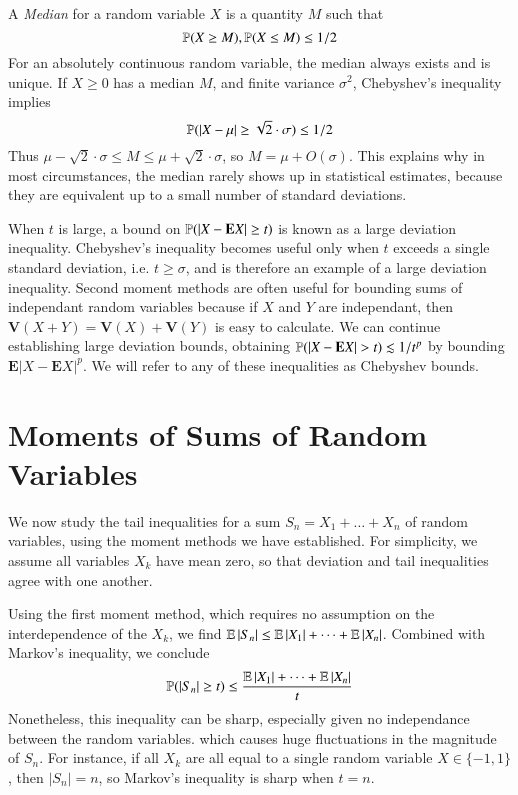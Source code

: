 \begin{example}
    A \emph{Median} for a random variable $X$ is a quantity $M$ such that
    \[ \operatorname{\mathbb{P}}(X \geq M), \operatorname{\mathbb{P}}(X \leq M) \leq 1/2 \]
    For an absolutely continuous random variable, the median always exists and is unique. If $X \geq 0$ has a median $M$, and finite variance $\sigma^2$, Chebyshev's inequality implies
    \[ \operatorname{\mathbb{P}}(|X - \mu| \geq \sqrt{2} \cdot \sigma) \leq 1/2 \]
    Thus $\mu - \sqrt{2} \cdot \sigma \leq M \leq \mu + \sqrt{2} \cdot \sigma$, so $M = \mu + O(\sigma)$. This explains why in most circumstances, the median rarely shows up in statistical estimates, because they are equivalent up to a small number of standard deviations.
\end{example}

When $t$ is large, a bound on $\operatorname{\mathbb{P}}(|X - \mathbf{E}X| \geq t)$ is known as a large deviation inequality. Chebyshev's inequality becomes useful only when $t$ exceeds a single standard deviation, i.e. $t \geq \sigma$, and is therefore an example of a large deviation inequality. Second moment methods are often useful for bounding sums of independant random variables because if $X$ and $Y$ are independant, then $\mathbf{V}(X + Y) = \mathbf{V}(X) + \mathbf{V}(Y)$ is easy to calculate. We can continue establishing large deviation bounds, obtaining $\operatorname{\mathbb{P}}(|X - \mathbf{E} X| > t) \lesssim 1/t^p$ by bounding $\mathbf{E}|X - \mathbf{E}X|^p$. We will refer to any of these inequalities as Chebyshev bounds.

\section{Moments of Sums of Random Variables}

We now study the tail inequalities for a sum $S_n = X_1 + \dots + X_n$ of random variables, using the moment methods we have established. For simplicity, we assume all variables $X_k$ have mean zero, so that deviation and tail inequalities agree with one another.

Using the first moment method, which requires no assumption on the interdependence of the $X_k$, we find $\operatorname{\mathbb{E}} |S_n| \leq \operatorname{\mathbb{E}} |X_1| + \dots + \operatorname{\mathbb{E}} |X_n|$. Combined with Markov's inequality, we conclude
%
\[ \mathbb{P}(|S_n| \geq t) \leq \frac{\operatorname{\mathbb{E}} |X_1| + \dots + \operatorname{\mathbb{E}} |X_n|}{t} \]
%
Nonetheless, this inequality can be sharp, especially given no independance between the random variables. which causes huge fluctuations in the magnitude of $S_n$. For instance, if all $X_k$ are all equal to a single random variable $X \in \{ -1, 1 \}$, then $|S_n| = n$, so Markov's inequality is sharp when $t = n$.

